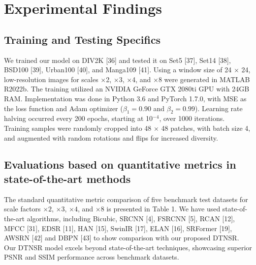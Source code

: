 \documentclass[journal]{IEEEtran}
\begin{document}
\section{Experimental Findings}

\subsection{Training and Testing Specifics} 

We trained our model on DIV2K [36] and tested it on Set5 [37], Set14 [38], BSD100 [39], Urban100 [40], and Manga109 [41]. Using a window size of 24 $\times$ 24, low-resolution images for scales $\times$2, $\times$3, $\times$4, and $\times$8 were generated in MATLAB R2022b. The training utilized an NVIDIA GeForce GTX 2080ti GPU with 24GB RAM. Implementation was done in Python 3.6 and PyTorch 1.7.0, with MSE as the loss function and Adam optimizer ($\beta_1 = 0.90$ and $\beta_2 = 0.99$). Learning rate halving occurred every 200 epochs, starting at 10$^{-4}$, over 1000 iterations. Training samples were randomly cropped into 48 $\times$ 48  patches, with batch size 4, and augmented with random rotations and flips for increased diversity.

\subsection{Evaluations based on quantitative metrics in state-of-the-art methods}
The standard quantitative metric comparison of five benchmark test datasets for scale factors $\times2$, $\times3$, $\times4$, and $\times8$  is presented in Table 1. We have used state-of-the-art algorithms, including Bicubic, SRCNN [4], FSRCNN [5], RCAN [12], MFCC [31], EDSR [11], HAN [15], SwinIR [17], ELAN [16], SRFormer [19], AWSRN [42] and DBPN [43] to show comparison with our proposed DTNSR. Our DTNSR model excels beyond state-of-the-art techniques, showcasing superior PSNR and SSIM performance across benchmark datasets.
\end{document}

